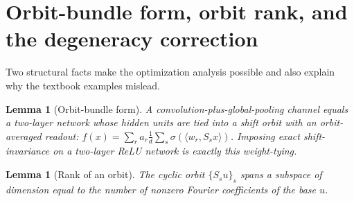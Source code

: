\documentclass[11pt]{article}
\theoremstyle{plain}
\newtheorem{lemma}[theorem]{Lemma}
\theoremstyle{definition}
\theoremstyle{remark}
\begin{document}
\section{Orbit-bundle form, orbit rank, and the degeneracy correction}\label{sec:orbit}

Two structural facts make the optimization analysis possible and also explain why the textbook examples mislead.

\begin{lemma}[Orbit-bundle form]\label{lem:bundle}
A convolution-plus-global-pooling channel equals a two-layer network whose hidden units are tied into a shift orbit
with an orbit-averaged readout: $f(x)=\sum_r a_r\frac1d\sum_s\sigma(\langle w_r,S_sx\rangle)$. Imposing exact
shift-invariance on a two-layer ReLU network is exactly this weight-tying.
\end{lemma}

\begin{lemma}[Rank of an orbit]\label{lem:rank}
The cyclic orbit $\{S_su\}_s$ spans a subspace of dimension equal to the number of nonzero Fourier coefficients of
the base $u$.
\end{lemma}
\end{document}
